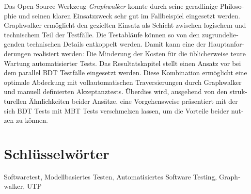 \begin{otherlanguage}{ngerman}
Das Open-Source Werkzeug \textit{Graphwalker} konnte durch seine geradlinige Philosophie und seinen klaren Einsatzzweck sehr gut im Fallbeispiel eingesetzt werden. Graphwalker ermöglicht den gezielten Einsatz als Schicht zwischen logischem und technischem Teil der Testfälle. Die Testabläufe können so von den zugrundeliegenden technischen Details entkoppelt werden. Damit kann eine der Hauptanforderungen realisiert werden: Die Minderung der Kosten für die üblicherweise teure Wartung automatisierter Tests. Das Resultatskapitel stellt einen Ansatz vor bei dem parallel \Gls{BDT} Testfälle eingesetzt werden. Diese Kombination ermöglicht eine optimale Abdeckung mit vollautomatischen Traversierungen durch Graphwalker und manuell definierten Akzeptanztests. Überdies wird, ausgehend von den strukturellen Ähnlichkeiten beider Ansätze, eine Vorgehensweise präsentiert mit der sich \Gls{BDT} Tests mit \Gls{MBT} Tests verschmelzen lassen, um die Vorteile beider nutzen zu können.

\bigskip

  \section*{Schlüsselwörter}
  Softwaretest, Modellbasiertes Testen, Automatisiertes Software Testing, Graphwalker, UTP

\end{otherlanguage}



